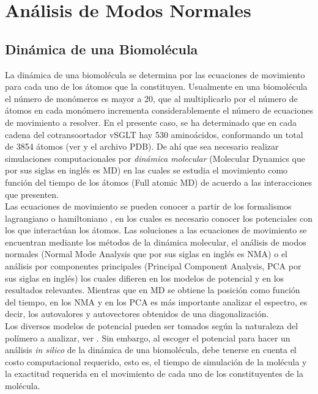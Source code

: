 \chapter{An\'{a}lisis de Modos Normales}\label{ch:Nor}

\section{Din\'{a}mica de una Biomol\'{e}cula}

La din\'{a}mica de una biomol\'{e}cula se determina por las ecuaciones de movimiento para cada uno de los \'{a}tomos que la constituyen. Usualmente en una biomol\'{e}cula el n\'{u}mero de mon\'{o}meros es mayor a 20, que al multiplicarlo por el n\'{u}mero de \'{a}tomos en cada mon\'{o}mero incrementa considerablemente el n\'{u}mero de ecuaciones de movimiento a resolver. En el presente caso, se ha determinado que en cada cadena del cotransoortador vSGLT hay 530 amino\'{a}cidos, conformando un total de 3854 \'{a}tomos (ver \cite{Faham2008} y el archivo PDB). De ah\'{i} que sea necesario realizar simulaciones computacionales por \textit{din\'{a}mica molecular} (Molecular Dynamics que por sus siglas en ingl\'{e}s es MD) en las cuales se estudia el movimiento como funci\'{o}n del tiempo de los \'{a}tomos (Full atomic MD) de acuerdo a las interacciones que presenten.\\

Las ecuaciones de movimiento se pueden conocer a partir de los formalismos lagrangiano o hamiltoniano \cite{Goldstein2001}, en los cuales es necesario conocer los potenciales con los que interact\'{u}an los \'{a}tomos. Las soluciones a las ecuaciones de movimiento se encuentran mediante los m\'{e}todos de la din\'{a}mica molecular, el an\'{a}lisis de modos normales (Normal Mode Analysis que por sus siglas en ingl\'{e}s es NMA) o el an\'{a}lisis por componentes principales (Principal Component Analysis, PCA por sus siglas en ingl\'{e}s) los cuales difieren en los modelos de potencial y en los resultados relevantes. Mientras que en MD se obtiene la posici\'{o}n como funci\'{o}n del tiempo, en los NMA y en los PCA  es m\'{a}s importante analizar el espectro, es decir, los autovalores y autovectores obtenidos de una diagonalizaci\'{o}n.\\

Los diversos modelos de potencial pueden ser tomados seg\'{u}n la naturaleza del pol\'{i}mero a analizar, ver \cite{Lezon2009}. Sin embargo, al escoger el potencial  para hacer un an\'{a}lisis \textit{in silico} de la din\'{a}mica de una biomol\'{e}cula, debe tenerse en cuenta el costo computacional requerido, esto es, el tiempo de simulaci\'{o}n de la mol\'{e}cula y la exactitud requerida en el movimiento de cada uno de los constituyentes de la mol\'{e}cula.\\

